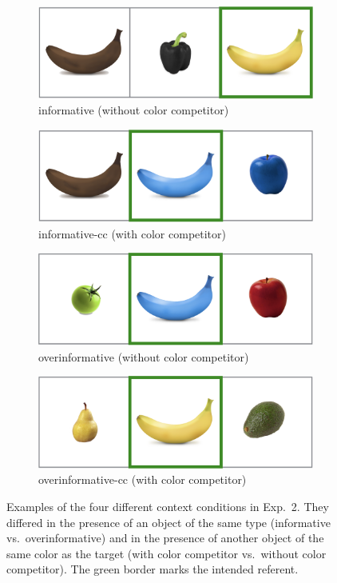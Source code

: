 \documentclass[11pt]{article}
\begin{document}
\begin{figure}[bt!]
	\begin{subfigure}{.5\textwidth}
		\centering
		\includegraphics[width=.8\textwidth]{pics/cond_inf.png}
		\caption{informative (without color competitor)}
		\label{fig:condInf}
	\end{subfigure}
	\begin{subfigure}{.5\textwidth}
		\centering
		\includegraphics[width=.8\textwidth]{pics/cond_infcc.png}
		\centering
		\caption{informative-cc (with color competitor)}
		\label{fig:condInfcc}
	\end{subfigure}
	\begin{subfigure}{.5\textwidth}
		\centering
		\includegraphics[width=.8\textwidth]{pics/cond_overinf.png}
		\caption{overinformative (without color competitor)}
		\label{fig:condOverinf}
	\end{subfigure}
	\begin{subfigure}{.5\textwidth}
		\centering
		\includegraphics[width=.8\textwidth]{pics/cond_overinfcc.png}
		\centering
		\caption{overinformative-cc (with color competitor)}
		\label{fig:condOverinfcc}
	\end{subfigure}
	\caption{Examples of the four different context conditions in Exp.~2. They differed in the presence of an object of the same type (informative vs.~overinformative) and in the presence of another object of the same color as the target (with color competitor vs.~without color competitor). The green border marks the intended referent.}
	\label{fig:conditions}
\end{figure}
\end{document}

